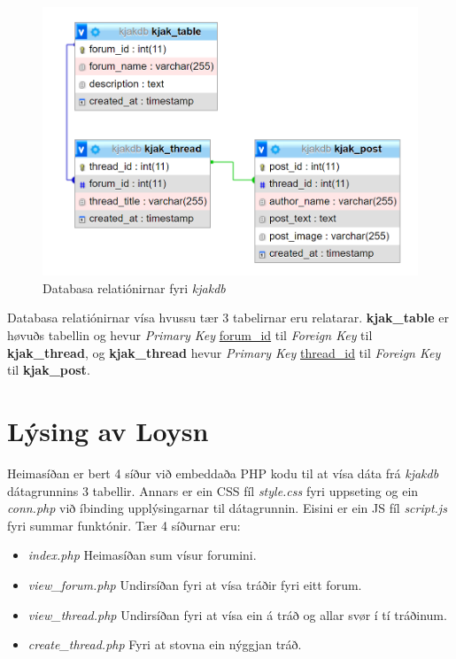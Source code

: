 \documentclass{article}
\begin{document}
\begin{figure}[H]
    \includegraphics[width=\linewidth]{kjakdb_table_relations.png}
    \caption{Databasa relatiónirnar fyri \textit{kjakdb}}
    \label{fig:kjakdb_table_relations}
\end{figure}

\par Databasa relatiónirnar vísa hvussu
tær 3 tabelirnar eru relatarar. \textbf{kjak\_table} er høvuðs tabellin og hevur
\textit{Primary Key} \underline{forum\_id} til \textit{Foreign Key} til \textbf{kjak\_thread},
og \textbf{kjak\_thread} hevur \textit{Primary Key} \underline{thread\_id} til \textit{Foreign Key}
til \textbf{kjak\_post}.
 
\section{Lýsing av Loysn}

\par Heimasíðan er bert 4 síður við embeddaða PHP kodu til at vísa dáta frá \textit{kjakdb}
dátagrunnins 3 tabellir. Annars er ein CSS fíl \textit{style.css} fyri uppseting
og ein \textit{conn.php} við
íbinding upplýsingarnar til dátagrunnin. Eisini er ein JS fíl \textit{script.js} fyri summar funktónir.
Tær 4 síðurnar eru:
\begin{itemize}
    \item \textit{index.php} \- Heimasíðan sum vísur forumini.
    \item \textit{view\_forum.php} \- Undirsíðan fyri at vísa tráðir fyri eitt forum.
    \item \textit{view\_thread.php} \- Undirsíðan fyri at vísa ein á tráð og allar svør í tí
            tráðinum.
    \item \textit{create\_thread.php} \- Fyri at stovna ein nýggjan tráð.
\end{itemize}
\end{document}
